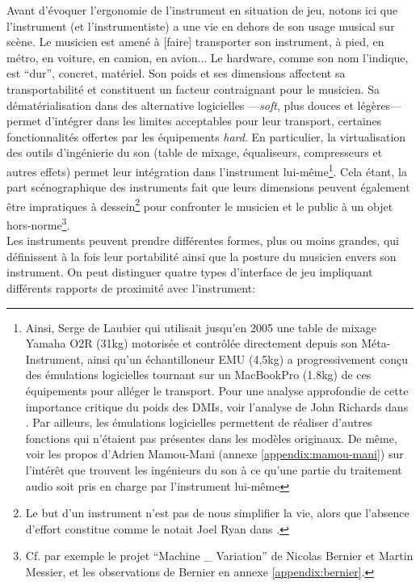 \noindent Avant d'évoquer l'ergonomie de l'instrument en situation de jeu, notons ici que l'instrument (et l'instrumentiste) a une vie en dehors de son usage musical sur scène. Le musicien est amené à [faire] transporter son instrument, à pied, en métro, en voiture, en camion, en avion... Le hardware, comme son nom l'indique, est ``dur'', concret, matériel. Son poids et ses dimensions affectent sa transportabilité et constituent un facteur contraignant pour le musicien. Sa dématérialisation dans des alternative logicielles —\textit{soft}, plus douces et légères— permet d'intégrer dans les limites acceptables pour leur transport, certaines fonctionnalités offertes par les équipements \textit{hard}. En particulier, la virtualisation des outils d'ingénierie du son (table de mixage, équaliseurs, compresseurs et autres effets) permet leur intégration dans l'instrument lui-même\footnote{Ainsi, Serge de Laubier qui utilisait jusqu'en 2005 une table de mixage Yamaha O2R (31kg) motorisée et contrôlée directement depuis son Méta-Instrument, ainsi qu'un échantilloneur EMU (4,5kg) a progressivement conçu des émulations logicielles tournant sur un MacBookPro (1.8kg) de ces équipements pour alléger le transport. Pour une analyse approfondie de cette importance critique du poids des \glspl{DMI}, voir l'analyse de John Richards dans \cite{richards_32kg_2006}. Par ailleurs, les émulations logicielles permettent de réaliser d'autres fonctions qui n'étaient pas présentes dans les modèles originaux. De même, voir les propos d'Adrien Mamou-Mani (annexe \ref{appendix:mamou-mani}) sur l'intérêt que trouvent les ingénieurs du son à ce qu'une partie du traitement audio soit pris en charge par l'instrument lui-même}. Cela étant, la part scénographique des instruments fait que leurs dimensions peuvent également être impratiques à dessein\footnote{Le but d'un instrument n'est pas de nous simplifier la vie, alors que l'absence d'effort constitue  comme le notait Joel Ryan dans \cite{ryan_remarks_1991}.} pour confronter le musicien et le public à un objet hors-norme\footnote{Cf. par exemple le projet ``Machine \_ Variation'' de Nicolas Bernier et Martin Messier, et les observations de Bernier en annexe \ref{appendix:bernier}.}.\\
\indent Les instruments peuvent prendre différentes formes, plus ou moins grandes, qui définissent à la fois leur portabilité ainsi que la posture du musicien envers son instrument. On peut distinguer quatre types d'interface de jeu impliquant différents rapports de proximité avec l'instrument:
